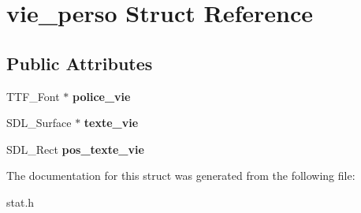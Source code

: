 \hypertarget{structvie__perso}{}\section{vie\+\_\+perso Struct Reference}
\label{structvie__perso}
\subsection*{Public Attributes}
\begin{DoxyCompactItemize}
\item 
\mbox{\label{structvie__perso_afd57a88c68a51436785e97929e6bb74d}} 
T\+T\+F\+\_\+\+Font $\ast$ {\bfseries police\+\_\+vie}
\item 
\mbox{\label{structvie__perso_a376ee3a635e48edafe9a5e6264356056}} 
S\+D\+L\+\_\+\+Surface $\ast$ {\bfseries texte\+\_\+vie}
\item 
\mbox{\label{structvie__perso_ac2eb84bf9052be13ad455458c9de4f38}} 
S\+D\+L\+\_\+\+Rect {\bfseries pos\+\_\+texte\+\_\+vie}
\end{DoxyCompactItemize}


The documentation for this struct was generated from the following file\+:\begin{DoxyCompactItemize}
\item 
stat.\+h\end{DoxyCompactItemize}
